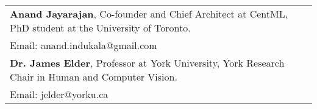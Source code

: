 \begin{tabularx}{\textwidth}{ @{}l r@{} }
    \textbf{Anand Jayarajan}, Co-founder and Chief Architect at CentML, PhD student at the University of Toronto. \\
    Email: anand.indukala@gmail.com \\[10pt]
    \textbf{Dr. James Elder}, Professor at York University,   York Research Chair in Human and Computer Vision. \\
    Email: jelder@yorku.ca 
\end{tabularx}